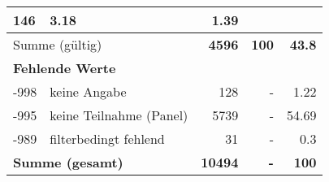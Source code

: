 \begin{longtable}{lXrrr}
       \num{146} &
       \num[round-mode=places,round-precision=2]{3,18} &
         \num[round-mode=places,round-precision=2]{1,39} \\
     \midrule
     \multicolumn{2}{l}{Summe (gültig)} &
       \textbf{\num{4596}} &
     \textbf{100} &
       \textbf{\num[round-mode=places,round-precision=2]{43,8}} \\
     \multicolumn{5}{l}{\textbf{Fehlende Werte}}\\
       -998 &
       keine Angabe &
         \num{128} &
        - &
         \num[round-mode=places,round-precision=2]{1,22} \\
       -995 &
       keine Teilnahme (Panel) &
         \num{5739} &
        - &
         \num[round-mode=places,round-precision=2]{54,69} \\
       -989 &
       filterbedingt fehlend &
         \num{31} &
        - &
         \num[round-mode=places,round-precision=2]{0,3} \\
     \midrule
     \multicolumn{2}{l}{\textbf{Summe (gesamt)}} &
          \textbf{\num{10494}} &
        \textbf{-} &
        \textbf{100} \\
     \bottomrule
     \end{longtable}
     
